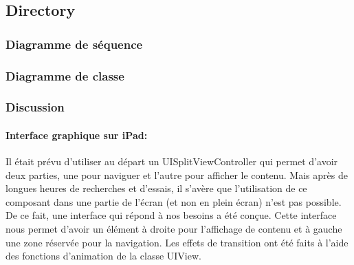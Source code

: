 	\subsection{Directory}
					\subsubsection*{Diagramme de séquence}

					\subsubsection*{Diagramme de classe}
					\subsubsection*{Discussion}
	
					\paragraph{Interface graphique sur iPad:} Il était prévu d'utiliser au départ un UISplitViewController qui permet d'avoir deux parties, une pour naviguer et l'autre pour afficher le contenu. Mais après de longues heures de recherches et d'essais, il s'avère que l'utilisation de ce composant dans une partie de l'écran (et non en plein écran) n'est pas possible. De ce fait, une interface qui répond à nos besoins a été conçue. Cette interface nous permet d'avoir un élément à droite pour l'affichage de contenu et à gauche une zone réservée pour la navigation. Les effets de transition ont été faits à l'aide des fonctions d'animation de la classe UIView. 
	\lstset{
			    style = Xcode,
			    caption=Exemple de 2 animations à l'aide de la classe UIView. La première change la taille  et l'emplacement d'un élément graphique et la deuxième change sa transparence.,
			    breaklines=true,
			    frame=single
			}

